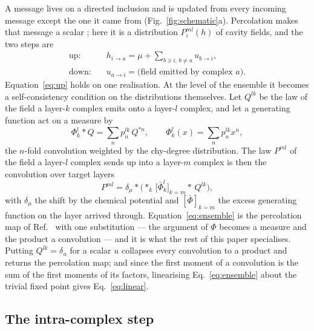 \documentclass[aps,pre,twocolumn,superscriptaddress,floatfix]{revtex4-2}
\begin{document}
A message lives on a directed inclusion and is updated from every incoming
message except the one it came from (Fig.~\ref{fig:schematic}a). Percolation makes that message a scalar
\cite{vazquez2023pre}; here it is a distribution $P^{ml}_i(h)$ of cavity fields,
and the two steps are
\begin{align}
  \text{up:}\quad & h_{i\to a}=\mu+\sum_{b\ni i,\,b\neq a}u_{b\to i},
  \label{eq:up}\\
  \text{down:}\quad & u_{a\to i}=\text{(field emitted by complex }a\text{)}.
  \label{eq:down}
\end{align}
Equation~\eqref{eq:up} holds on one realisation. At the level of the ensemble it
becomes a self-consistency condition on the distributions themselves. Let
$Q^{lk}$ be the law of the field a layer-$k$ complex emits onto a layer-$l$
complex, and let a generating function act on a measure by
\begin{equation}
  \Phi^l_k\!\ast\!Q=\sum_{n}p^{lk}_{n}\,Q^{\ast n},
  \qquad \Phi^l_k(x)=\sum_n p^{lk}_n x^n,
  \label{eq:conv}
\end{equation}
the $n$-fold convolution weighted by the chy-degree distribution. The law
$P^{ml}$ of the field a layer-$l$ complex sends up into a layer-$m$ complex is
then the convolution over target layers
\begin{equation}
  P^{ml}=\delta_{\mu}\ast\Big(\ast_{k}\,
    \big[\bar\Phi^{l}_{k}\big]_{k=m}\!\ast\,Q^{lk}\Big),
  \label{eq:ensemble}
\end{equation}
with $\delta_\mu$ the shift by the chemical potential and
$[\bar\Phi]_{k=m}$ the excess generating function on the layer arrived through.
Equation~\eqref{eq:ensemble} is the percolation map of
Ref.~\cite{vazquez2023pre} with one substitution --- the argument of $\Phi$
becomes a measure and the product a convolution --- and it is what the rest of
this paper specialises. Putting $Q^{lk}=\delta_{u}$ for a scalar $u$ collapses
every convolution to a product and returns the percolation map; and since the
first moment of a convolution is the sum of the first moments of its factors,
linearising Eq.~\eqref{eq:ensemble} about the trivial fixed point gives
Eq.~\eqref{eq:linear}.

\subsection{The intra-complex step}
\label{sec:emitted}
\end{document}
